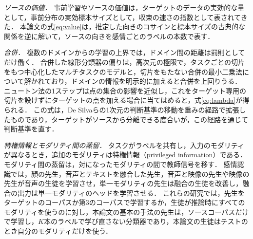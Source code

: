 \emph{ソースの価値．}
事前学習やソースの価値は，ターゲットのデータの実効的な量として\cite{hernandez2021scaling,lescao2021data}，事前分布の実効標本サイズとして\cite{wiesenfarth2020quantification}，収束の速さの指数として\cite{hanneke2019value}表されてきた．
本論文の式\eqref{eq:value}は，推定した向きのコサインと標本サイズの古典的な関係\cite{raudys1998intrinsic,dobriban2018highdimensional}を逆に解いて，ソースの向きを感情ごとのラベルの本数で表す．

\emph{合併．}
複数のドメインからの学習の上界では，ドメイン間の距離は罰則としてだけ働く\cite{bendavid2010theory,blitzer2007learning}．
合併した線形分類器の偏りは，高次元の極限で，タスクごとの切片をもつ中心化したマルチタスクのモデル\cite{tiomoko2021deciphering}と，切片をもたない合併の最小二乗法\cite{yang2025precise}について解かれており，ドメインの情報を明示的に加えると合併を上回りうる\cite{zhu2026domain}．
ニュートン法の1ステップは点の集合の影響を近似し\cite{pregibon1981logistic,koh2019accuracy}，これをターゲット専用の切片を設けずにターゲットの点を加える場合に当てはめると，式\eqref{eq:lambda}が得られる．
この式は，De Silvaら\cite{desilva2023value}の1次元の判断基準の移動を重みの経路で拡張したものであり，ターゲットがソースから分離できる度合いが，この経路を通じて判断基準を直す．

\emph{特権情報とモダリティ間の蒸留．}
タスクがラベルを共有し，入力のモダリティが異なるとき，追加のモダリティは特権情報（privileged information）である\cite{vapnik2009new,lopezpaz2016unifying}．
モダリティ間の蒸留は，対になったモダリティの間で教師信号を移す\cite{gupta2016cross}．
感情認識では，顔の先生\cite{albanie2018emotion}，音声とテキストを融合した先生\cite{srinivasan2022representation}，音声と映像の先生や映像の先生\cite{pendyala2025leveraging,hajavi2024audio}が音声の生徒を学習させ，単一モダリティの先生は融合の生徒を改善し\cite{du2021improving,xue2021multimodal,rakib2025g2d}，融合の出力は単一モダリティのヘッドを学習させる\cite{jaritz2020xmuda}．
これらの研究では，先生をターゲットのコーパスか第3のコーパスで学習するか，生徒が推論時にすべてのモダリティを使うのに対し，本論文の基本の手法の先生は，ソースコーパスだけで学習し，$K$本のラベルで学び直さない分類器であり，本論文の生徒はテストのとき自分のモダリティだけを使う．

